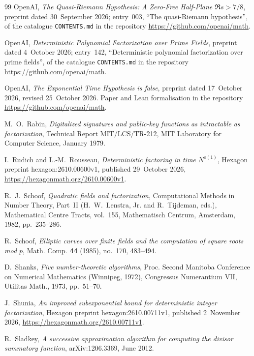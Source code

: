 \documentclass[10pt]{amsart}
\theoremstyle{plain}
\theoremstyle{definition}
\theoremstyle{remark}
\numberwithin{equation}{section}
\begin{document}
\begin{thebibliography}{99}
OpenAI, \emph{The {Q}uasi-{R}iemann {H}ypothesis: {A} {Z}ero-{F}ree {H}alf-{P}lane $\Re s>7/8$}, preprint
dated 30~September 2026; entry~003, ``The quasi-Riemann hypothesis'', of the catalogue \texttt{CONTENTS.md}
in the repository \url{https://github.com/openai/math}.

OpenAI, \emph{Deterministic {P}olynomial {F}actorization over {P}rime {F}ields}, preprint dated 4~October
2026; entry~142, ``Deterministic polynomial factorization over prime fields'', of the catalogue
\texttt{CONTENTS.md} in the repository \url{https://github.com/openai/math}.

OpenAI, \emph{The {E}xponential {T}ime {H}ypothesis is false}, preprint dated 17~October 2026, revised
25~October 2026. Paper and Lean formalisation in the repository \url{https://github.com/openai/math}.

M.~O.~Rabin, \emph{Digitalized signatures and public-key functions as intractable as factorization},
Technical Report MIT/LCS/TR-212, MIT Laboratory for Computer Science, January 1979.

I.~Rudich and L.-M.~Rousseau, \emph{Deterministic factoring in time $N^{o(1)}$}, Hexagon preprint
hexagon:2610.00600v1, published 29~October 2026, \url{https://hexagonmath.org/2610.00600v1}.

R.~J.~Schoof, \emph{Quadratic fields and factorization}, Computational Methods in Number Theory, Part~II
(H.~W.~Lenstra, Jr. and R.~Tijdeman, eds.), Mathematical Centre Tracts, vol.~155, Mathematisch Centrum,
Amsterdam, 1982, pp.~235--286.

R.~Schoof, \emph{Elliptic curves over finite fields and the computation of square roots mod $p$}, Math.
Comp. \textbf{44} (1985), no.~170, 483--494.

D.~Shanks, \emph{Five number-theoretic algorithms}, Proc. Second Manitoba Conference on Numerical
Mathematics (Winnipeg, 1972), Congressus Numerantium VII, Utilitas Math., 1973, pp.~51--70.

J.~Shunia, \emph{An improved subexponential bound for deterministic integer factorization}, Hexagon
preprint hexagon:2610.00711v1, published 2~November 2026, \url{https://hexagonmath.org/2610.00711v1}.

R.~Sladkey, \emph{A successive approximation algorithm for computing the divisor summatory function},
arXiv:1206.3369, June 2012.


\end{thebibliography}
\end{document}
